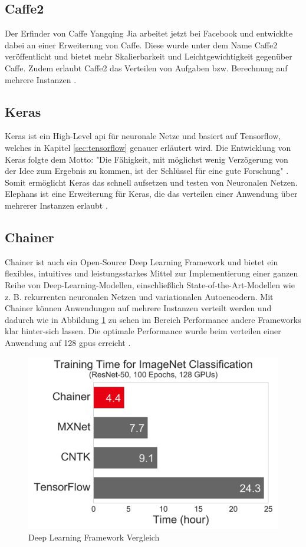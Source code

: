 \subsection{Caffe2}
Der Erfinder von Caffe Yangqing Jia arbeitet jetzt bei Facebook und entwicklte dabei an einer Erweiterung von Caffe. Diese wurde unter dem Name Caffe2 veröffentlicht und bietet mehr Skalierbarkeit und Leichtgewichtigkeit gegenüber Caffe. Zudem erlaubt Caffe2 das Verteilen von Aufgaben bzw. Berechnung auf mehrere Instanzen \cite{Caffe2}.

\subsection{Keras}
Keras ist ein High-Level \ac{api} für neuronale Netze und basiert auf Tensorflow, welches in Kapitel \ref{sec:tensorflow} genauer erläutert wird. Die Entwicklung von Keras folgte dem Motto: "Die Fähigkeit, mit möglichst wenig Verzögerung von der Idee zum Ergebnis zu kommen, ist der Schlüssel für eine gute Forschung" \cite{Keras}. Somit ermöglicht Keras das schnell aufsetzen und testen von Neuronalen Netzen. Elephans ist eine Erweiterung für Keras, die das verteilen einer Anwendung über mehrerer Instanzen erlaubt \cite{Elephas}.

\subsection{Chainer}
Chainer ist auch ein Open-Source Deep Learning Framework und bietet ein flexibles, intuitives und leistungsstarkes Mittel zur Implementierung einer ganzen Reihe von Deep-Learning-Modellen, einschließlich State-of-the-Art-Modellen wie z. B. rekurrenten neuronalen Netzen und variationalen Autoencodern. Mit Chainer können Anwendungen auf mehrere Instanzen verteilt werden und dadurch wie in Abbildung \ref{fig:chainercomparisson} zu sehen im Bereich Performance andere Frameworks klar hinter-sich lassen. Die optimale Performance wurde beim verteilen einer Anwendung auf 128 \ac{gpu}s erreicht \cite{Chainer}.

\begin{figure}[h!]
	\centering
	\includegraphics[width=0.9\linewidth]{Pictures/Chainer_Comparisson}
	\caption[Deep Learning Framework Vergleich]{Deep Learning Framework Vergleich \cite{Chainer}}
	\label{fig:chainercomparisson}
\end{figure}

